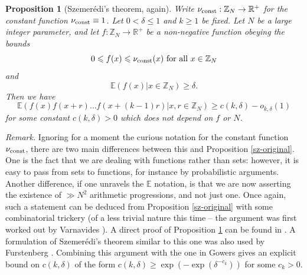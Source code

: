 \documentclass[12pt,a4paper,reqno]{amsart}
\numberwithin{equation}{section}
\theoremstyle{plain}
\newtheorem{proposition}[subsection]{Proposition}
\theoremstyle{definition}
\renewcommand{\leq}{\leqslant}
\renewcommand{\geq}{\geqslant}
\def\vconst{\ensuremath \nu_{\mbox{\scriptsize const}}}
\def\vconstlem{\ensuremath \nu_{\mbox{\scriptsize \textup{const}}}}
\def\E{{\mathbb E}}
\def\R{{\mathbb R}}
\def\vs{\vspace{11pt}}
\begin{document}
\begin{proposition}[Szemer\'edi's theorem, again]\label{sz} Write $\vconstlem : \mathbb{Z}_N \rightarrow \R^+$ for the constant function $\vconstlem \equiv 1$. Let $0 < \delta \leq 1$ and $k \geq 1$ be fixed.  Let $N$ be a large integer parameter, and let
$f: \mathbb{Z}_N \to \R^+$ be a non-negative function obeying the bounds
\begin{equation}\label{f-bound} 0 \leq f(x) \leq \vconstlem(x) \hbox{ for all } x \in \mathbb{Z}_N
\end{equation}
and
\begin{equation}\label{pos-dens} \E(f(x) | x \in \mathbb{Z}_N) \geq \delta.\end{equation}
Then we have
$$ \E( f(x) f(x+r) \ldots f(x+(k-1)r) | x,r \in \mathbb{Z}_N) \geq c(k,\delta) - o_{k,\delta}(1)$$
for some constant $c(k,\delta) > 0$ which does not depend on $f$ or $N$.
\end{proposition}
\noindent\textit{Remark.} Ignoring for a moment the curious notation for the constant function $\vconst$, there are two main differences between this and Proposition \ref{sz-original}. One is the fact that we are dealing with functions rather than sets: however, it is easy to pass from sets to functions, for instance by probabilistic arguments. Another difference, if one unravels the $\mathbb{E}$ notation, is that we are now asserting the existence of $\gg N^2$ arithmetic progressions, and not just one. Once again, such a statement can be deduced from Proposition \ref{sz-original} with some combinatorial trickery (of a less trivial nature this time -- the argument was first worked out by Varnavides \cite{varnavides}).  A direct proof of Proposition \ref{sz} can be found in \cite{tao:ergodic}.  A formulation of Szemer\'edi's theorem similar to this one was also used by Furstenberg \cite{furst}.  Combining this argument with the one in Gowers gives an explicit bound on $c(k,\delta)$ of the form $c(k,\delta) \geq \exp(-\exp(\delta^{-c_k}))$ for some $c_k > 0$.\vs
\end{document}
